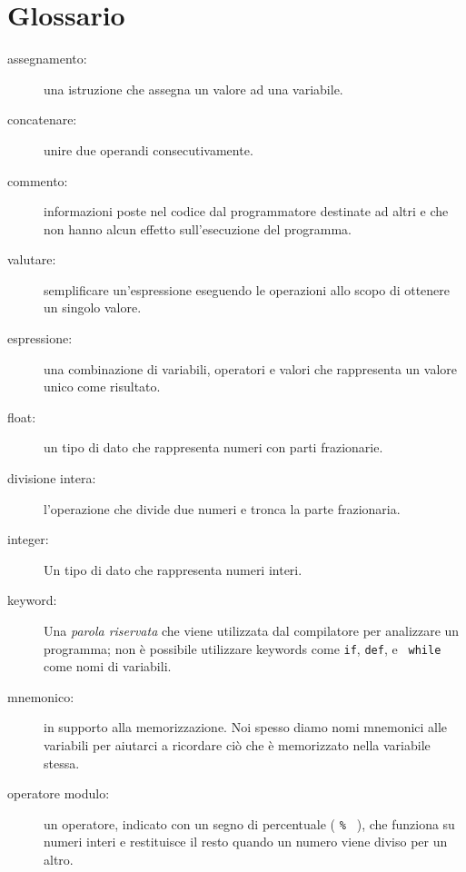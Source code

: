 

\section{Glossario}

\begin{description}

\item[assegnamento:]  una istruzione che assegna un valore ad una variabile.

\item[concatenare:]  unire due operandi consecutivamente.

\item[commento:]  informazioni poste nel codice dal programmatore destinate ad altri e che non hanno alcun effetto sull'esecuzione del programma. 

\item[valutare:]  semplificare un'espressione eseguendo le operazioni allo scopo di ottenere un singolo valore.

\item[espressione:]  una combinazione di variabili, operatori e valori che rappresenta un valore unico come risultato. 

\item[float:] un tipo di dato che rappresenta numeri con parti frazionarie.
   

\item[divisione intera:] l'operazione che divide due numeri e tronca la parte frazionaria. 

\item[integer:] Un tipo di dato che rappresenta numeri interi.  

\item[keyword:]  Una \emph{parola riservata }che viene utilizzata dal compilatore per analizzare un programma; non \`{e} possibile utilizzare keywords come {\tt if}, {\tt  def}, e {\tt
while} come nomi di variabili.  

\item[mnemonico:] in supporto alla memorizzazione. Noi spesso diamo nomi mnemonici alle variabili per aiutarci a ricordare ci\`{o} che \`{e} memorizzato nella variabile stessa.

\item[operatore modulo:]  un operatore, indicato con un segno di percentuale ( {\tt \% } ), che funziona su numeri interi e restituisce il resto quando un numero viene diviso per un altro.
 


\end{description}
